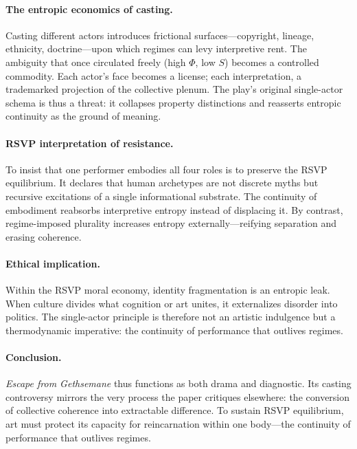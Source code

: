 \documentclass[12pt]{article}
\begin{document}
\paragraph{The entropic economics of casting.}
Casting different actors introduces frictional surfaces—copyright, lineage, ethnicity, doctrine—upon which regimes can levy interpretive rent.  
The ambiguity that once circulated freely (high $\Phi$, low $S$) becomes a controlled commodity.  
Each actor’s face becomes a license; each interpretation, a trademarked projection of the collective plenum.  
The play’s original single-actor schema is thus a threat: it collapses property distinctions and reasserts entropic continuity as the ground of meaning.

\paragraph{RSVP interpretation of resistance.}
To insist that one performer embodies all four roles is to preserve the RSVP equilibrium.  
It declares that human archetypes are not discrete myths but recursive excitations of a single informational substrate.  
The continuity of embodiment reabsorbs interpretive entropy instead of displacing it.  
By contrast, regime-imposed plurality increases entropy externally—reifying separation and erasing coherence.

\paragraph{Ethical implication.}
Within the RSVP moral economy, identity fragmentation is an entropic leak.  
When culture divides what cognition or art unites, it externalizes disorder into politics.  
The single-actor principle is therefore not an artistic indulgence but a thermodynamic imperative: the continuity of performance that outlives regimes.

\paragraph{Conclusion.}
\emph{Escape from Gethsemane} thus functions as both drama and diagnostic.  
Its casting controversy mirrors the very process the paper critiques elsewhere: the conversion of collective coherence into extractable difference.  
To sustain RSVP equilibrium, art must protect its capacity for reincarnation within one body—the continuity of performance that outlives regimes.
\end{document}
